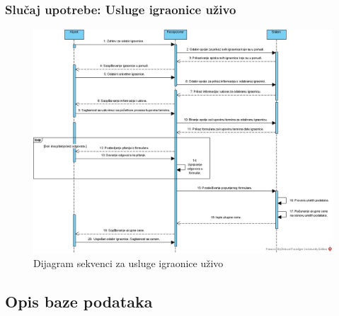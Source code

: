 \documentclass[a4paper]{article}
\begin{document}
\subsubsection{Slučaj upotrebe: Usluge igraonice uživo}

\begin{figure}[!ht]
\begin{center}
\includegraphics[scale=0.4]{sections/images/dijagram_sekvenci_usluge_igraonice_uzivo.jpg}
\end{center}
\caption{Dijagram sekvenci za usluge igraonice uživo}
\label{fig:kontekst}
\end{figure}

\newpage
\newpage
\newpage
\subsection{Opis baze podataka}

\end{document}
